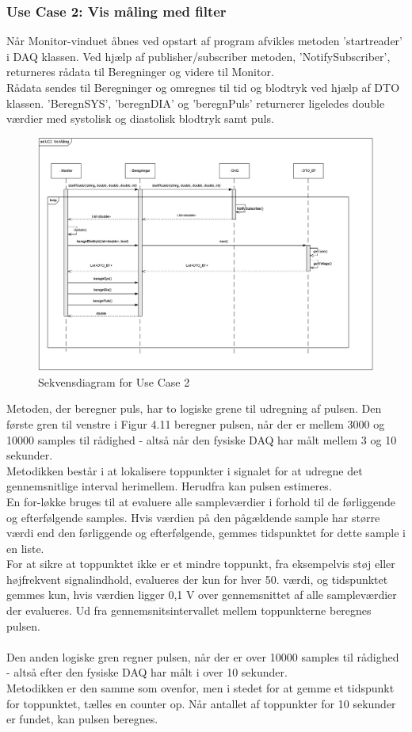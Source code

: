 \subsubsection{Use Case 2: Vis måling med filter}
Når Monitor-vinduet åbnes ved opstart af program afvikles metoden 'startreader' i DAQ klassen. Ved hjælp af publisher/subscriber metoden, 'NotifySubscriber', returneres rådata til Beregninger og videre til Monitor.\\
Rådata sendes til Beregninger og omregnes til tid og blodtryk ved hjælp af DTO klassen.
'BeregnSYS', 'beregnDIA' og 'beregnPuls' returnerer ligeledes double værdier med systolisk og diastolisk blodtryk samt puls. 
\begin{figure}[H]
	\centering
	\includegraphics[width=1\textwidth]{Figurer/UC2_SD_SW}
	\caption{Sekvensdiagram for Use Case 2}
\end{figure}

Metoden, der beregner puls, har to logiske grene til udregning af pulsen. Den første gren til venstre i Figur 4.11 beregner pulsen, når der er mellem 3000 og 10000 samples til rådighed - altså når den fysiske DAQ har målt mellem 3 og 10 sekunder.\\
Metodikken består i at lokalisere toppunkter i signalet for at udregne det gennemsnitlige interval herimellem. Herudfra kan pulsen estimeres. \\
En for-løkke bruges til at evaluere alle sampleværdier i forhold til de førliggende og efterfølgende samples. Hvis værdien på den pågældende sample har større værdi end den førliggende og efterfølgende, gemmes tidspunktet for dette sample i en liste.\\ 
For at sikre at toppunktet ikke er et mindre toppunkt, fra eksempelvis støj eller højfrekvent signalindhold, evalueres der kun for hver 50. værdi, og tidspunktet gemmes kun, hvis værdien ligger 0,1 V over gennemsnittet af alle sampleværdier der evalueres. Ud fra gennemsnitsintervallet mellem toppunkterne beregnes pulsen.
\\
\\
Den anden logiske gren regner pulsen, når der er over 10000 samples til rådighed - altså efter den fysiske DAQ har målt i over 10 sekunder.\\ 
Metodikken er den samme som ovenfor, men i stedet for at gemme et tidspunkt for toppunktet, tælles en counter op. Når antallet af toppunkter for 10 sekunder er fundet, kan pulsen beregnes.

